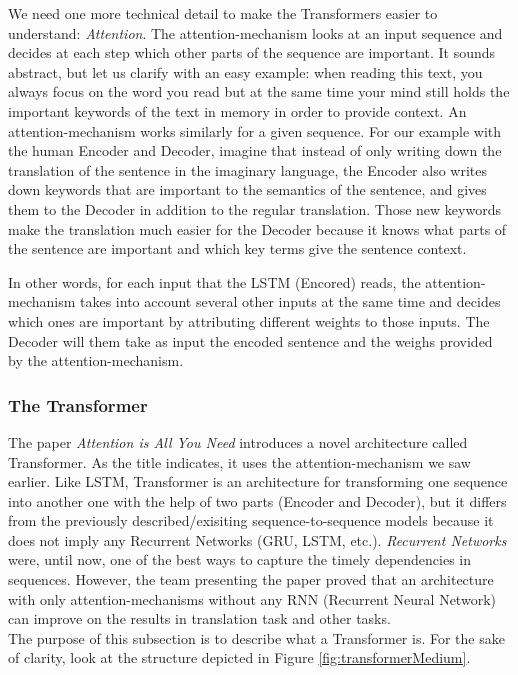 We need one more technical detail to make the Transformers easier to understand: \textit{Attention}. The attention-mechanism looks at an input sequence and decides at each step which other parts of the sequence are important. It sounds abstract, but let us clarify with an easy example: when reading this text, you always focus on the word you read but at the same time your mind still holds the important keywords of the text in memory in order to provide context. An attention-mechanism works similarly for a given sequence. For our example with the human Encoder and Decoder, imagine that instead of only writing down the translation of the sentence in the imaginary language, the Encoder also writes down keywords that are important to the semantics of the sentence, and gives them to the Decoder in addition to the regular translation. Those new keywords make the translation much easier for the Decoder because it knows what parts of the sentence are important and which key terms give the sentence context. \newline

In other words, for each input that the LSTM (Encored) reads, the attention-mechanism takes into account several other inputs at the same time and decides which ones are important by attributing different weights to those inputs. The Decoder will them take as input the encoded sentence and the weighs provided by the attention-mechanism.

\subsubsection{The Transformer}
The paper \textit{Attention is All You Need} introduces a novel architecture called Transformer. As the title indicates, it uses the attention-mechanism we saw earlier. Like LSTM, Transformer is an architecture for transforming one sequence into another one with the help of two parts (Encoder and Decoder), but it differs from the previously described/exisiting sequence-to-sequence models because it does not imply any Recurrent Networks (GRU, LSTM, etc.). \textit{Recurrent Networks} were, until now, one of the best ways to capture the timely dependencies in sequences. However, the team presenting the paper proved that an architecture with only attention-mechanisms without any RNN (Recurrent Neural Network) can improve on the results in translation task and other tasks. \\ The purpose of this subsection is to describe what a Transformer is. For the sake of clarity, look at the structure depicted in Figure \ref{fig:transformerMedium}. \newline

